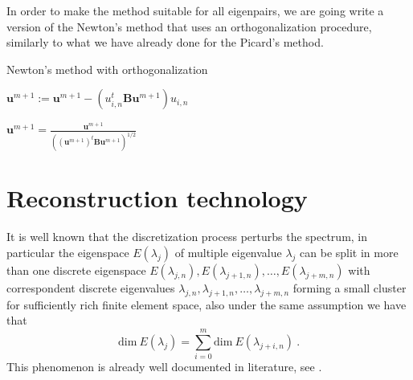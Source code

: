 \documentclass[preprint ,12pt]{elsarticle}
\begin{document}
In order to make the method suitable for all eigenpairs, we are going write a version of the Newton's method that uses an orthogonalization procedure, similarly to what we have already done for the Picard's method.
\begin{algorithm}[H] \caption{Newton's method with orthogonalization} \label{alg:newton_ortho} 
\begin{algorithmic}

    

\REPEAT



\STATE $\mathbf{u}^{m+1}:=\mathbf{u}^{m+1}-(u_{i,n}^t\mathbf{B}\mathbf{u}^{m+1})u_{i,n}$
\ENDFOR


\STATE $\displaystyle \mathbf{u}^{m+1}=\frac{\mathbf{u}^{m+1}}{((\mathbf{u}^{m+1})^t\mathbf{B}\mathbf{u}^{m+1})^{1/2}}$
\end{algorithmic}
\end{algorithm}


\section{Reconstruction technology}

It is well known that the discretization process perturbs the spectrum, in particular the eigenspace $E(\lambda_j)$ of multiple eigenvalue $\lambda_j$ can be split in more than one discrete eigenspace $E(\lambda_{j,n}),E(\lambda_{j+1,n}),\dots,E(\lambda_{j+m,n})$ with correspondent discrete eigenvalues $\lambda_{j,n},\lambda_{j+1,n},\dots,\lambda_{j+m,n}$ forming a small cluster for sufficiently rich finite element space, also under the same assumption we have that
$$
\mathrm{dim}\ E(\lambda_j)=\sum_{i=0}^m\mathrm{dim}\ E(\lambda_{j+i,n})\ .
$$
This phenomenon is already well documented in literature,  see \cite{strang, babuska, hackbusch}.
\end{document}
